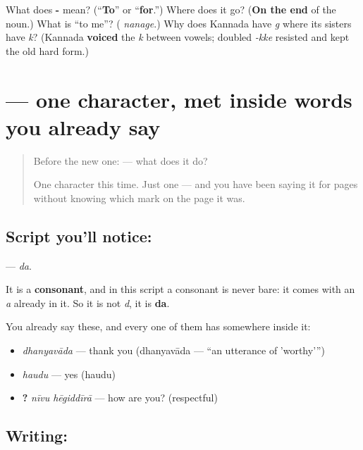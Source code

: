 \begin{tcolorbox}[breakable,colback=teal!4,colframe=teal!35!black,title={Before you move on}]
What does \textbf{-} mean? (\textquotedblleft{}\textbf{To}\textquotedblright{} or \textquotedblleft{}\textbf{for}.\textquotedblright{}) Where does it go? (\textbf{On the end} of the noun.) What is \textquotedblleft{}to me\textquotedblright{}? (\textbf{} \emph{nanage}.) Why does Kannada have \emph{g} where its sisters have \emph{k}? (Kannada \textbf{voiced} the \emph{k} between vowels; doubled \emph{-kke} resisted and kept the old hard form.)
\end{tcolorbox}
\section[\texorpdfstring{\kn{ದ} (da)}{ದ (da)}]{ — one character, met inside words you already say}

\label{lesson:KA-S06-letter-da}



\begin{quote}
Before the new one:  — what does it do?

One character this time. Just one — and you have been saying it for pages without knowing which mark on the page it was.
\end{quote}

\subsection*{Script you'll notice: }
\textbf{} — \emph{da}.

It is a \textbf{consonant}, and in this script a consonant is never bare: it comes with an \emph{a} already in it. So it is not \emph{d}, it is \textbf{da}.

You already say these, and every one of them has  somewhere inside it:

\begin{itemize}
\raggedright
  \item \textbf{} \emph{dhanyavāda} — thank you (dhanyavāda — \textquotedblleft{}an utterance of 'worthy'\textquotedblright{})
  \item \textbf{} \emph{haudu} — yes (haudu)
  \item \textbf{ ?} \emph{nīvu hēgiddīrā} — how are you? (respectful)
\end{itemize}

\subsection*{Writing: }

